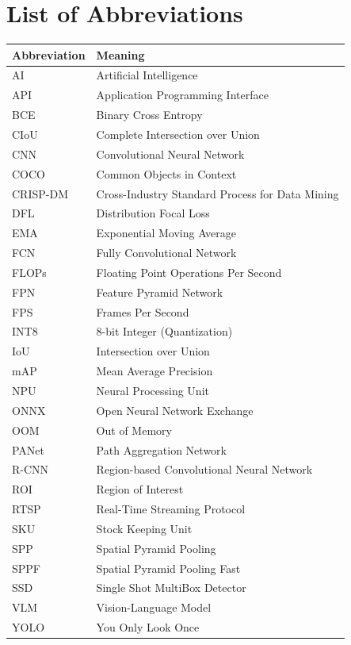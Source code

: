 ﻿\chapter*{List of Abbreviations}
\begin{center}
\renewcommand{\arraystretch}{1.2}
\label{tab:abbreviations}
\begin{tabular}{|p{}|p{}|}
\hline
\textbf{Abbreviation} & \textbf{Meaning} \\
\hline
AI & Artificial Intelligence \\
\hline
API & Application Programming Interface \\
\hline
BCE & Binary Cross Entropy \\
\hline
CIoU & Complete Intersection over Union \\
\hline
CNN & Convolutional Neural Network \\
\hline
COCO & Common Objects in Context \\
\hline
CRISP-DM & Cross-Industry Standard Process for Data Mining \\
\hline
DFL & Distribution Focal Loss \\
\hline
EMA & Exponential Moving Average \\
\hline
FCN & Fully Convolutional Network \\
\hline
FLOPs & Floating Point Operations Per Second \\
\hline
FPN & Feature Pyramid Network \\
\hline
FPS & Frames Per Second \\
\hline
INT8 & 8-bit Integer (Quantization) \\
\hline
IoU & Intersection over Union \\
\hline
mAP & Mean Average Precision \\
\hline
NPU & Neural Processing Unit \\
\hline
ONNX & Open Neural Network Exchange \\
\hline
OOM & Out of Memory \\
\hline
PANet & Path Aggregation Network \\
\hline
R-CNN & Region-based Convolutional Neural Network \\
\hline
ROI & Region of Interest \\
\hline
RTSP & Real-Time Streaming Protocol \\
\hline
SKU & Stock Keeping Unit \\
\hline
SPP & Spatial Pyramid Pooling \\
\hline
SPPF & Spatial Pyramid Pooling Fast \\
\hline
SSD & Single Shot MultiBox Detector \\
\hline
VLM & Vision-Language Model \\
\hline
YOLO & You Only Look Once \\
\hline
\end{tabular}
\end{center}

